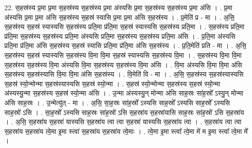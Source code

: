 \documentclass[17pt]{extarticle}
\begin{document}
22. स॒हस्र॑स्य प्र॒मा प्र॒मा स॒हस्र॑स्य स॒हस्र॑स्य प्र॒मा अ॑स्यसि प्र॒मा स॒हस्र॑स्य स॒हस्र॑स्य प्र॒मा अ॑सि । . प्र॒मा अ॑स्यसि प्र॒मा प्र॒मा अ॑सि स॒हस्र॑स्य स॒हस्र॑ स्यासि प्र॒मा प्र॒मा अ॑सि स॒हस्र॑स्य । . प्र॒मेति॑ प्र - मा । . अ॒सि॒ स॒हस्र॑स्य स॒हस्र॑ स्यास्यसि स॒हस्र॑स्य प्रति॒मा प्र॑ति॒मा स॒हस्र॑ स्यास्यसि स॒हस्र॑स्य प्रति॒मा । . स॒हस्र॑स्य प्रति॒मा प्र॑ति॒मा स॒हस्र॑स्य स॒हस्र॑स्य प्रति॒मा अ॑स्यसि प्रति॒मा स॒हस्र॑स्य स॒हस्र॑स्य प्रति॒मा अ॑सि । . प्र॒ति॒मा अ॑स्यसि प्रति॒मा प्र॑ति॒मा अ॑सि स॒हस्र॑स्य स॒हस्र॑ स्यासि प्रति॒मा प्र॑ति॒मा अ॑सि स॒हस्र॑स्य । . प्र॒ति॒मेति॑ प्रति - मा । . अ॒सि॒ स॒हस्र॑स्य स॒हस्र॑ स्यास्यसि स॒हस्र॑स्य वि॒मा वि॒मा स॒हस्र॑ स्यास्यसि स॒हस्र॑स्य वि॒मा । . स॒हस्र॑स्य वि॒मा वि॒मा स॒हस्र॑स्य स॒हस्र॑स्य वि॒मा अ॑स्यसि वि॒मा स॒हस्र॑स्य स॒हस्र॑स्य वि॒मा अ॑सि । . वि॒मा अ॑स्यसि वि॒मा वि॒मा अ॑सि स॒हस्र॑स्य स॒हस्र॑स्यासि वि॒मा वि॒मा अ॑सि स॒हस्र॑स्य । . वि॒मेति॑ वि - मा । . अ॒सि॒ स॒हस्र॑स्य स॒हस्र॑स्यास्यसि स॒हस्र॑ स्यो॒न्मोन्मा स॒हस्र॑स्यास्यसि स॒हस्र॑ स्यो॒न्मा । . स॒हस्र॑ स्यो॒न्मोन्मा स॒हस्र॑स्य स॒हस्र॑ स्यो॒न्मा अ॑स्यस्यु॒न्मा स॒हस्र॑स्य स॒हस्र॑ स्यो॒न्मा अ॑सि । . उ॒न्मा अ॑स्यस्यु॒न् मोन्मा अ॑सि साह॒स्रः सा॑ह॒स्रो᳚ ऽस्यु॒न् मोन्मा अ॑सि साह॒स्रः । . उ॒न्मेत्यु॑त् - मा । . अ॒सि॒ सा॒ह॒स्रः सा॑ह॒स्रो᳚ ऽस्यसि साह॒स्रो᳚ ऽस्यसि साह॒स्रो᳚ ऽस्यसि साह॒स्रो॑ ऽसि । . सा॒ह॒स्रो᳚ ऽस्यसि साह॒स्रः सा॑ह॒स्रो॑ ऽसि स॒हस्रा॑य स॒हस्रा॑यासि साह॒स्रः सा॑ह॒स्रो॑ ऽसि स॒हस्रा॑य । . अ॒सि॒ स॒हस्रा॑य स॒हस्रा॑ यास्यसि स॒हस्रा॑य त्वा त्वा स॒हस्रा॑ यास्यसि स॒हस्रा॑य त्वा । . स॒हस्रा॑य त्वा त्वा स॒हस्रा॑य स॒हस्रा॑य त्वे॒मा इ॒मा स्त्वा॑ स॒हस्रा॑य स॒हस्रा॑य त्वे॒माः । . त्वे॒मा इ॒मा स्त्वा᳚ त्वे॒मा मे॑ म इ॒मा स्त्वा᳚ त्वे॒मा मे᳚ । \newline
\end{document}
